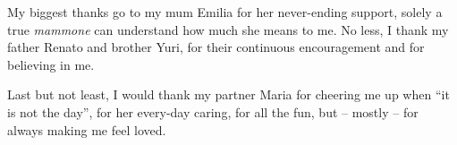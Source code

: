 \begin{acknowledgements}
\noindent My biggest thanks go to my mum Emilia for her never-ending support, solely a true \emph{mammone} can understand how much she means to me.
No less, I thank my father Renato and brother Yuri, for their continuous encouragement and for believing in me.

\noindent Last but not least, I would thank my partner Maria for cheering me up when ``it is not the day'', for her every-day caring, for all the fun, but -- mostly -- for always making me feel loved.

\end{acknowledgements}
